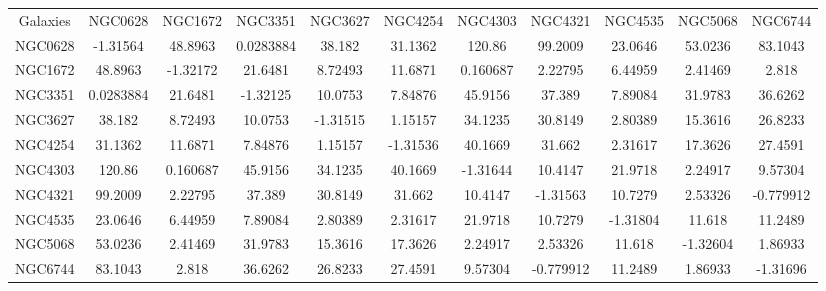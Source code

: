\begin{table}
\begin{tabular}{ccccccccccc}
Galaxies & NGC0628 & NGC1672 & NGC3351 & NGC3627 & NGC4254 & NGC4303 & NGC4321 & NGC4535 & NGC5068 & NGC6744 \\
NGC0628 & -1.31564 & 48.8963 & 0.0283884 & 38.182 & 31.1362 & 120.86 & 99.2009 & 23.0646 & 53.0236 & 83.1043 \\
NGC1672 & 48.8963 & -1.32172 & 21.6481 & 8.72493 & 11.6871 & 0.160687 & 2.22795 & 6.44959 & 2.41469 & 2.818 \\
NGC3351 & 0.0283884 & 21.6481 & -1.32125 & 10.0753 & 7.84876 & 45.9156 & 37.389 & 7.89084 & 31.9783 & 36.6262 \\
NGC3627 & 38.182 & 8.72493 & 10.0753 & -1.31515 & 1.15157 & 34.1235 & 30.8149 & 2.80389 & 15.3616 & 26.8233 \\
NGC4254 & 31.1362 & 11.6871 & 7.84876 & 1.15157 & -1.31536 & 40.1669 & 31.662 & 2.31617 & 17.3626 & 27.4591 \\
NGC4303 & 120.86 & 0.160687 & 45.9156 & 34.1235 & 40.1669 & -1.31644 & 10.4147 & 21.9718 & 2.24917 & 9.57304 \\
NGC4321 & 99.2009 & 2.22795 & 37.389 & 30.8149 & 31.662 & 10.4147 & -1.31563 & 10.7279 & 2.53326 & -0.779912 \\
NGC4535 & 23.0646 & 6.44959 & 7.89084 & 2.80389 & 2.31617 & 21.9718 & 10.7279 & -1.31804 & 11.618 & 11.2489 \\
NGC5068 & 53.0236 & 2.41469 & 31.9783 & 15.3616 & 17.3626 & 2.24917 & 2.53326 & 11.618 & -1.32604 & 1.86933 \\
NGC6744 & 83.1043 & 2.818 & 36.6262 & 26.8233 & 27.4591 & 9.57304 & -0.779912 & 11.2489 & 1.86933 & -1.31696 \\
\end{tabular}
\end{table}
